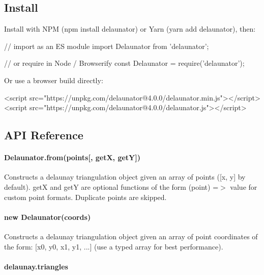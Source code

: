 \subsection*{Install}

Install with N\+PM ({\ttfamily npm install delaunator}) or Yarn ({\ttfamily yarn add delaunator}), then\+:


\begin{DoxyCode}
// import as an ES module
import Delaunator from 'delaunator';

// or require in Node / Browserify
const Delaunator = require('delaunator');
\end{DoxyCode}


Or use a browser build directly\+:


\begin{DoxyCode}
<script src="https://unpkg.com/delaunator@4.0.0/delaunator.min.js"></script> 
<script src="https://unpkg.com/delaunator@4.0.0/delaunator.js"></script> 
\end{DoxyCode}


\subsection*{A\+PI Reference}

\paragraph*{Delaunator.\+from(points\mbox{[}, get\+X, get\+Y\mbox{]})}

Constructs a delaunay triangulation object given an array of points ({\ttfamily \mbox{[}x, y\mbox{]}} by default). {\ttfamily getX} and {\ttfamily getY} are optional functions of the form {\ttfamily (point) =$>$ value} for custom point formats. Duplicate points are skipped.

\paragraph*{new Delaunator(coords)}

Constructs a delaunay triangulation object given an array of point coordinates of the form\+: {\ttfamily \mbox{[}x0, y0, x1, y1, ...\mbox{]}} (use a typed array for best performance).

\paragraph*{delaunay.\+triangles}

